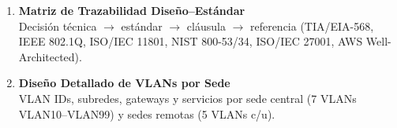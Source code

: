 \documentclass[11pt, a4paper, oneside]{report}
\begin{document}
\begin{enumerate}[label=\textbf{Anexo \Alph*.},leftmargin=4cm,labelsep=0.4cm,itemsep=14pt]
  \item {}\label{anex:trazabilidad}
  \textbf{Matriz de Trazabilidad Diseño--Estándar}\\
  Decisión técnica $\to$ estándar $\to$ cláusula $\to$ referencia (TIA/EIA-568,
  IEEE 802.1Q, ISO/IEC 11801, NIST 800-53/34, ISO/IEC 27001, AWS Well-Architected).

  \item {}\label{anex:vlans_detalle}
  \textbf{Diseño Detallado de VLANs por Sede}\\
  VLAN IDs, subredes, gateways y servicios por sede central
  (7 VLANs VLAN10--VLAN99) y sedes remotas (5 VLANs c/u).

\end{enumerate}

\renewcommand{\bibname}{Referencias Normativas}
\nocite{*}

\end{document}
